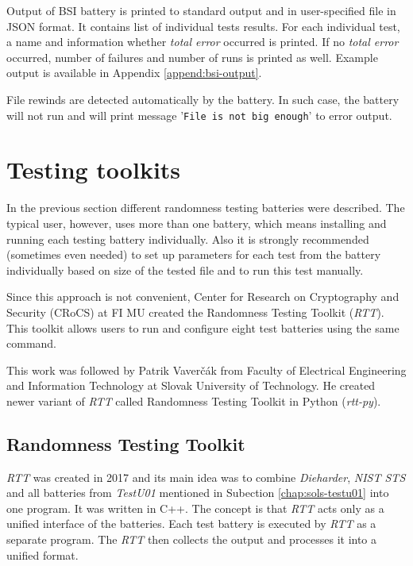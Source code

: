 \documentclass[
  digital,     %
  oneside,     %
  nosansbold,  %
  nocolorbold, %
  nolof,         %
  nolot,         %
]{fithesis4}
\begin{document}
Output of BSI battery is printed to standard output and in user-specified file in JSON format. It contains list of individual tests results. For each individual test, a name and information whether \emph{total error} occurred is printed. If no \emph{total error} occurred, number of failures and number of runs is printed as well. Example output is available in Appendix \ref{append:bsi-output}.

File rewinds are detected automatically by the battery. In such case, the battery will not run and will print message 
'\texttt{File is not big enough}' to error output.



\section{Testing toolkits}\label{chap:sols-toolkits}
In the previous section different randomness testing batteries were described. The typical user, however, uses more than one battery, which means installing and running each testing battery individually. Also it is strongly recommended (sometimes even needed) to set up parameters for each test from the battery individually based on size of the tested file and to run this test manually.

Since this approach is not convenient, Center for Research on Cryptography and Security (CRoCS) at FI MU created the Randomness Testing Toolkit (\emph{RTT}).\cite{rtt-obratil} This toolkit allows users to run and configure eight test batteries using the same command.

This work was followed by Patrik Vaverčák from Faculty of Electrical Engineering and Information Technology at Slovak University of Technology. He created newer variant of \emph{RTT} called Randomness Testing Toolkit in Python (\emph{rtt-py}). \cite{vavercak}

\subsection{Randomness Testing Toolkit} \label{chap:sols-rtt}

\emph{RTT} was created in 2017 and its main idea was to combine \emph{Dieharder}, \emph{NIST STS} and all batteries from \emph{TestU01} mentioned in Subection \ref{chap:sols-testu01} into one program. It was written in C++. The concept is that \emph{RTT} acts only as a unified interface of the batteries. Each test battery is executed by \emph{RTT} as a separate program. The \emph{RTT} then collects the output and processes it into a unified format.~\cite[p.~8]{rtt-obratil}
\end{document}
